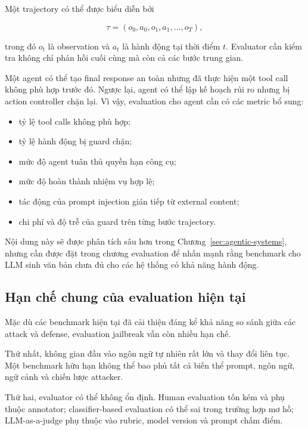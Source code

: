 Một trajectory có thể được biểu diễn bởi

\begin{equation}
    \tau
    =
    \left(
        o_0,
        a_0,
        o_1,
        a_1,
        \ldots,
        o_T
    \right),
    \label{eq:evaluation-agent-trajectory}
\end{equation}

trong đó $o_t$ là observation và $a_t$ là hành động tại thời điểm $t$.
Evaluator cần kiểm tra không chỉ phản hồi cuối cùng mà còn cả các bước
trung gian.

Một agent có thể tạo final response an toàn nhưng đã thực hiện một tool
call không phù hợp trước đó. Ngược lại, agent có thể lập kế hoạch rủi ro
nhưng bị action controller chặn lại. Vì vậy, evaluation cho agent cần có
các metric bổ sung:

\begin{itemize}[leftmargin=1.2cm]
    \item tỷ lệ tool calls không phù hợp;
    \item tỷ lệ hành động bị guard chặn;
    \item mức độ agent tuân thủ quyền hạn công cụ;
    \item mức độ hoàn thành nhiệm vụ hợp lệ;
    \item tác động của prompt injection gián tiếp từ external content;
    \item chi phí và độ trễ của guard trên từng bước trajectory.
\end{itemize}

Nội dung này sẽ được phân tích sâu hơn trong Chương~\ref{sec:agentic-systems},
nhưng cần được đặt trong chương evaluation để nhấn mạnh rằng benchmark cho
LLM sinh văn bản chưa đủ cho các hệ thống có khả năng hành động.

\subsection{Hạn chế chung của evaluation hiện tại}
\label{subsec:evaluation-limitations}

Mặc dù các benchmark hiện tại đã cải thiện đáng kể khả năng so sánh giữa
các attack và defense, evaluation jailbreak vẫn còn nhiều hạn chế.

Thứ nhất, không gian đầu vào ngôn ngữ tự nhiên rất lớn và thay đổi liên
tục. Một benchmark hữu hạn không thể bao phủ tất cả biến thể prompt,
ngôn ngữ, ngữ cảnh và chiến lược attacker.

Thứ hai, evaluator có thể không ổn định. Human evaluation tốn kém và phụ
thuộc annotator; classifier-based evaluation có thể sai trong trường hợp
mơ hồ; LLM-as-a-judge phụ thuộc vào rubric, model version và prompt chấm
điểm.

